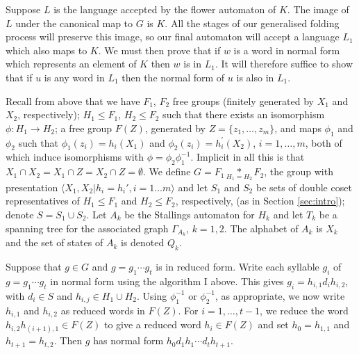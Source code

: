 \documentclass[a4paper,12pt]{article}
\newcommand{\G}{\Gamma }
\newcommand{\nul}{\emptyset }
\numberwithin{equation}{section}
\numberwithin{figure}{section}
\newcommand{\la}{\langle}
\newcommand{\ra}{\rangle}
\begin{document}
 Suppose $L$ is the
language accepted by the flower automaton of $K$. The image of $L$ under
the canonical map to $G$ is $K$. All the stages of our generalised folding
process will preserve this image, so our final automaton will accept a language
$L_1$ which also maps to $K$. We must then prove that if $w$ is a word
in normal form which represents an element of $K$ then $w$ is in $L_1$. It will
therefore suffice to show that if $u$ is any word in $L_1$ then the
normal form of $u$ is also in $L_1$.

Recall from above that we have $F_1$, $F_2$ free groups (finitely
generated by $X_1$ and $X_2$, respectively);
 $H_1 \leq F_1$, $H_2 \leq F_2$ such that
there exists an isomorphism $\phi: H_1 \rightarrow H_2$; a free group
 $F(Z)$, generated by $Z=\{z_1, \ldots, z_m\}$,
and  maps $\phi_1$ and $\phi_2$ such that $\phi_1(z_i)=h_i(X_1)  $
and  $\phi_2(z_i)=h^\prime_i(X_2)$, $i=1,\ldots ,m$, both of which
induce isomorphisms with $\phi=\phi_2\phi_1^{-1}$. Implicit in all
this is that $X_1\cap X_2=X_1\cap Z = X_2\cap Z=\nul$. We define
${G = F_1 \underset{H_1=H_2}{\ast} F_2}$, the group with
 presentation $\la X_1,X_2 | h_i = h_i', i=1 \ldots m\ra$ and
let $S_1$ and $S_2$ be sets of  double coset representatives of
$H_1\le F_1$ and $H_2\le F_2$, respectively, (as in Section
\ref{sec:intro}); denote $S= S_1 \cup S_2$. Let $A_k$ be the
Stallings automaton for $H_k$ and let $T_k$ be a spanning tree for
the associated graph $\G_{A_k}$, $k=1,2$. The alphabet of $A_k$ is
$X_k$ and the set of states of $A_k$ is denoted $Q_k$. 

Suppose that $g \in G$ and $g=g_1\cdots g_t$ is in reduced form.
Write each syllable $g_i$ of $g=g_1\cdots g_t$ in normal form
using the algorithm I above. This gives
$g_i=h_{i,1}d_ih_{i,2}$, with $d_i\in S$ and $h_{i,j}\in H_1\cup
H_2$. Using $\phi_1^{-1}$ or $\phi_2^{-1}$, as appropriate, we now
write $h_{i,1}$ and $h_{i,2}$ as reduced words in $F(Z)$. For
$i=1,\ldots , t-1$, we reduce the word $h_{i,2}h_{(i+1),1}\in
F(Z)$ to give a reduced word $h_i\in F(Z)$ and set $h_0=h_{1,1}$
and  $h_{t+1}=h_{t,2}$. Then $g$ has normal form $h_0d_1h_1\cdots
d_th_{t+1}$.
\end{document}
